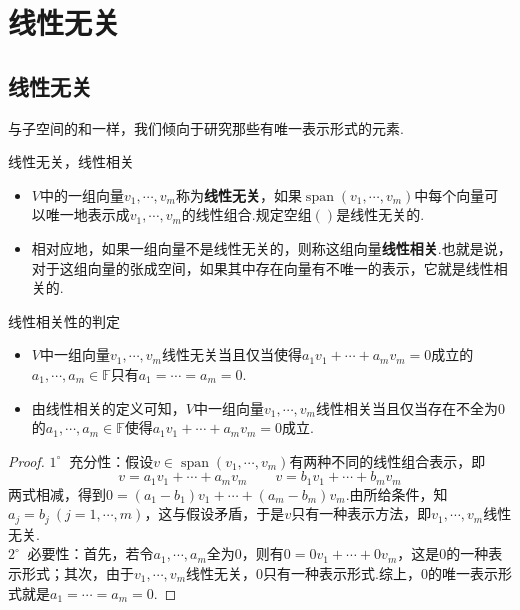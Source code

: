 \documentclass[lang=cn, zihao=5]{elegantbook}
\newcommand{\F}{\mathbb{F}}
\newcommand{\buzhou}[1]{$#1^{\circ} \ $}
\DeclareMathOperator{\spn}{span}
\begin{document}
\newpage
\section{线性无关}

\subsection{线性无关}

与子空间的和一样，我们倾向于研究那些有唯一表示形式的元素.

\begin{definition}{线性无关，线性相关}
	\begin{itemize}
		\item $V$中的一组向量$v_1, \cdots , v_m$称为\textbf{线性无关}，如果$\spn (v_1, \cdots ,v_m)$中每个向量可以唯一地表示成$v_1, \cdots ,v_m$的线性组合.规定空组$()$是线性无关的.
		\item 相对应地，如果一组向量不是线性无关的，则称这组向量\textbf{线性相关}.也就是说，对于这组向量的张成空间，如果其中存在向量有不唯一的表示，它就是线性相关的.
	\end{itemize}
\end{definition}

\begin{proposition}{线性相关性的判定}
	\begin{itemize}
		\item $V$中一组向量$v_1, \cdots ,v_m$线性无关当且仅当使得$a_1v_1 + \cdots + a_mv_m = 0$成立的$a_1 , \cdots ,a_m \in \F$只有$a_1= \cdots =a_m =0$.
		\item 由线性相关的定义可知，$V$中一组向量$v_1, \cdots ,v_m$线性相关当且仅当存在不全为$0$的$a_1 , \cdots ,a_m \in \F$使得$a_1v_1 + \cdots + a_mv_m = 0$成立.
	\end{itemize}
\end{proposition}
\begin{proof}
	\buzhou{1} 充分性：假设$v \in \spn (v_1, \cdots , v_m)$有两种不同的线性组合表示，即
	$$v = a_1v_1 + \cdots + a_mv_m \qquad v = b_1v_1 + \cdots + b_mv_m$$
	两式相减，得到$0=(a_1-b_1)v_1 + \cdots + (a_m-b_m)v_m$.由所给条件，知$a_j=b_j ~(j=1,\cdots ,m)$，这与假设矛盾，于是$v$只有一种表示方法，即$v_1, \cdots ,v_m$线性无关. \\
	\buzhou{2} 必要性：首先，若令$a_1, \cdots , a_m$全为$0$，则有$0=0v_1 + \cdots + 0v_m$，这是$0$的一种表示形式；其次，由于$v_1, \cdots ,v_m$线性无关，$0$只有一种表示形式.综上，$0$的唯一表示形式就是$a_1= \cdots = a_m =0$.
\end{proof}
\end{document}
